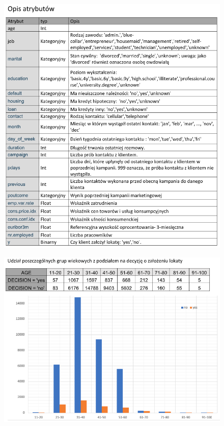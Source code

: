 \documentclass[12pt,a4paper]{article}
\begin{document}
\begin{figure}[H]
	\centering
	\includegraphics[scale=0.65]{data_1.png}
\end{figure}

\begin{figure}[H]
	\centering
	\includegraphics[scale=0.65]{data_2.png}
\end{figure}
\end{document}
